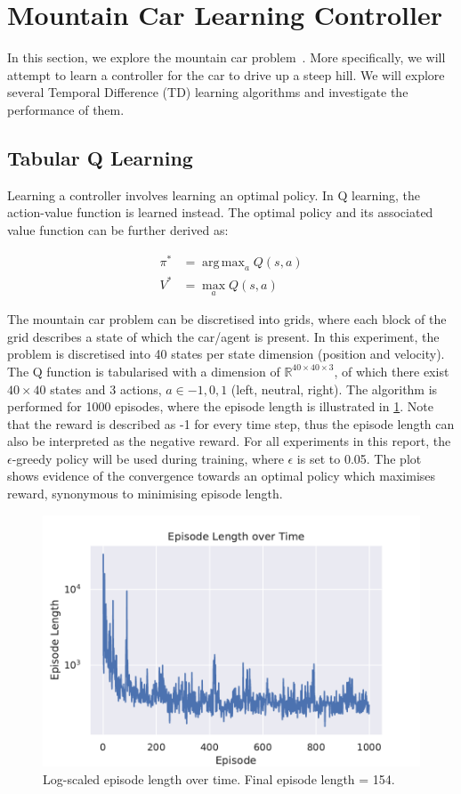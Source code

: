 \documentclass{article}
\DeclareMathOperator*{\argmax}{arg\,max}
\begin{document}
\section{Mountain Car Learning Controller}

In this section, we explore the mountain car problem~\cite{mooreEfficientMemorybasedLearning1990}. More specifically, we will attempt to learn a controller for the car to drive up a steep hill. We will explore several Temporal Difference (TD) learning algorithms and investigate the performance of them.

\subsection{Tabular Q Learning}

Learning a controller involves learning an optimal policy. In Q learning, the action-value function is learned instead. The optimal policy and its associated value function can be further derived as:

\begin{equation}
    \begin{split}
        \pi^* &= \argmax_{a} Q(s, a) \\
        V^* &= \max_{a} Q(s, a) 
    \end{split}
    \label{eq:optimal-V}
\end{equation}

The mountain car problem can be discretised into grids, where each block of the grid describes a state of which the car/agent is present. In this experiment, the problem is discretised into 40 states per state dimension (position and velocity). The Q function is tabularised with a dimension of $\mathbb{R}^{40 \times 40 \times 3}$, of which there exist $40 \times 40$ states and 3 actions, $a \in {-1, 0, 1}$ (left, neutral, right). The algorithm is performed for 1000 episodes, where the episode length is illustrated in \cref{fig:ep-length}. Note that the reward is described as -1 for every time step, thus the episode length can also be interpreted as the negative reward. For all experiments in this report, the $\epsilon$-greedy policy will be used during training, where $\epsilon$ is set to 0.05. The plot shows evidence of the convergence towards an optimal policy which maximises reward, synonymous to minimising episode length.

\begin{figure}
    \centering
    \includegraphics[width=.7\linewidth]{Figures/ep_length.pdf}
    \caption{Log-scaled episode length over time. Final episode length = 154.}
    \label{fig:ep-length}
\end{figure}
\end{document}
